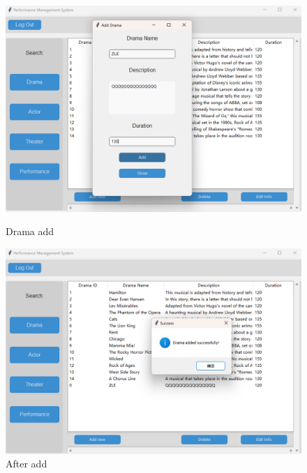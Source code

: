 \documentclass[12pt]{article}
\begin{document}
\begin{figure}[H]
    \centering
    \begin{minipage}{0.48\textwidth}
        \centering
        \includegraphics[width=\textwidth]{27.png}
        \caption{Drama add} 
        \label{Figure 27}
    \end{minipage}
    \hfill
    \begin{minipage}{0.48\textwidth}
        \centering
        \includegraphics[width=\textwidth]{28.png}
        \caption{After add}
        \label{Figure 28}
    \end{minipage}
\end{figure}
\end{document}
